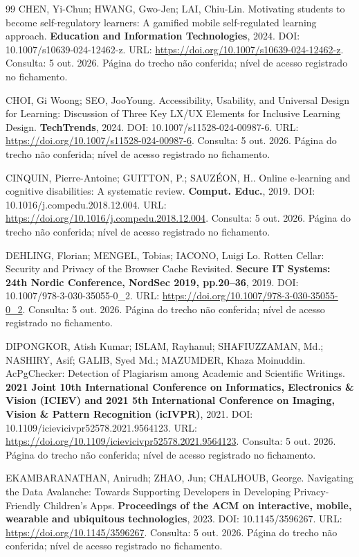 \begin{thebibliography}{99}
 CHEN, Yi-Chun; HWANG, Gwo-Jen; LAI, Chiu-Lin. Motivating students to become self-regulatory learners: A gamified mobile self-regulated learning approach. \textbf{Education and Information Technologies}, 2024. DOI: 10.1007/s10639-024-12462-z. URL: \url{https://doi.org/10.1007/s10639-024-12462-z}. Consulta: 5 out. 2026. Página do trecho não conferida; nível de acesso registrado no fichamento.

 CHOI, Gi Woong; SEO, JooYoung. Accessibility, Usability, and Universal Design for Learning: Discussion of Three Key LX/UX Elements for Inclusive Learning Design. \textbf{TechTrends}, 2024. DOI: 10.1007/s11528-024-00987-6. URL: \url{https://doi.org/10.1007/s11528-024-00987-6}. Consulta: 5 out. 2026. Página do trecho não conferida; nível de acesso registrado no fichamento.

 CINQUIN, Pierre-Antoine; GUITTON, P.; SAUZÉON, H.. Online e-learning and cognitive disabilities: A systematic review. \textbf{Comput. Educ.}, 2019. DOI: 10.1016/j.compedu.2018.12.004. URL: \url{https://doi.org/10.1016/j.compedu.2018.12.004}. Consulta: 5 out. 2026. Página do trecho não conferida; nível de acesso registrado no fichamento.

 DEHLING, Florian; MENGEL, Tobias; IACONO, Luigi Lo. Rotten Cellar: Security and Privacy of the Browser Cache Revisited. \textbf{Secure IT Systems: 24th Nordic Conference, NordSec 2019, pp.20–36}, 2019. DOI: 10.1007/978-3-030-35055-0\_2. URL: \url{https://doi.org/10.1007/978-3-030-35055-0_2}. Consulta: 5 out. 2026. Página do trecho não conferida; nível de acesso registrado no fichamento.

 DIPONGKOR, Atish Kumar; ISLAM, Rayhanul; SHAFIUZZAMAN, Md.; NASHIRY, Asif; GALIB, Syed Md.; MAZUMDER, Khaza Moinuddin. AcPgChecker: Detection of Plagiarism among Academic and Scientific Writings. \textbf{2021 Joint 10th International Conference on Informatics, Electronics \& Vision (ICIEV) and 2021 5th International Conference on Imaging, Vision \& Pattern Recognition (icIVPR)}, 2021. DOI: 10.1109/icievicivpr52578.2021.9564123. URL: \url{https://doi.org/10.1109/icievicivpr52578.2021.9564123}. Consulta: 5 out. 2026. Página do trecho não conferida; nível de acesso registrado no fichamento.

 EKAMBARANATHAN, Anirudh; ZHAO, Jun; CHALHOUB, George. Navigating the Data Avalanche: Towards Supporting Developers in Developing Privacy-Friendly Children’s Apps. \textbf{Proceedings of the ACM on interactive, mobile, wearable and ubiquitous technologies}, 2023. DOI: 10.1145/3596267. URL: \url{https://doi.org/10.1145/3596267}. Consulta: 5 out. 2026. Página do trecho não conferida; nível de acesso registrado no fichamento.


\end{thebibliography}
